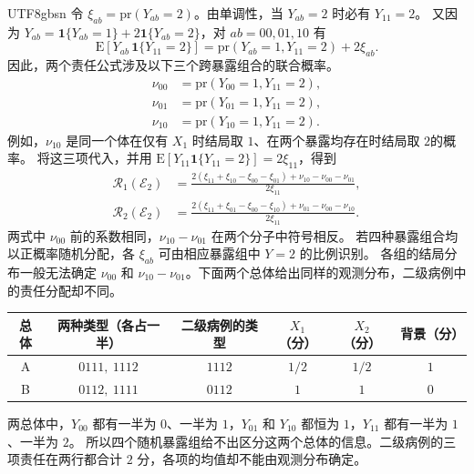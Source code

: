 \documentclass[11pt,a4paper]{article}
\begin{document}
\begin{CJK*}{UTF8}{gbsn}
令 $\xi_{ab}=\mathrm{pr}(Y_{ab}=2)$。由单调性，当 $Y_{ab}=2$ 时必有 $Y_{11}=2$。
又因为 $Y_{ab}=\mathbf{1}\{Y_{ab}=1\}+2\mathbf{1}\{Y_{ab}=2\}$，对 $ab=00,01,10$ 有
\[
 \mathrm E\!\left[Y_{ab}\,\mathbf{1}\{Y_{11}=2\}\right]
 =\mathrm{pr}(Y_{ab}=1,Y_{11}=2)+2\xi_{ab}.
\]
因此，两个责任公式涉及以下三个跨暴露组合的联合概率。
\[
\begin{aligned}
 \nu_{00}&=\mathrm{pr}(Y_{00}=1,Y_{11}=2),\\
 \nu_{01}&=\mathrm{pr}(Y_{01}=1,Y_{11}=2),\\
 \nu_{10}&=\mathrm{pr}(Y_{10}=1,Y_{11}=2).
\end{aligned}
\]
例如，$\nu_{10}$ 是同一个体在仅有 $X_1$ 时结局取 $1$、在两个暴露均存在时结局取 $2$的概率。
将这三项代入，并用 $\mathrm E[Y_{11}\mathbf{1}\{Y_{11}=2\}]=2\xi_{11}$，得到
\[
\begin{aligned}
 \mathcal R_1(\mathcal E_2)
 &=\frac{2(\xi_{11}+\xi_{10}-\xi_{00}-\xi_{01})+\nu_{10}-\nu_{00}-\nu_{01}}{2\xi_{11}},\\[3pt]
 \mathcal R_2(\mathcal E_2)
 &=\frac{2(\xi_{11}+\xi_{01}-\xi_{00}-\xi_{10})+\nu_{01}-\nu_{00}-\nu_{10}}{2\xi_{11}}.
\end{aligned}
\]
两式中 $\nu_{00}$ 前的系数相同，$\nu_{10}-\nu_{01}$ 在两个分子中符号相反。
若四种暴露组合均以正概率随机分配，各 $\xi_{ab}$ 可由相应暴露组中 $Y=2$ 的比例识别。
各组的结局分布一般无法确定 $\nu_{00}$ 和 $\nu_{10}-\nu_{01}$。下面两个总体给出同样的观测分布，二级病例中的责任分配却不同。
\begin{center}
\small
\renewcommand{\arraystretch}{1.22}
\begin{tabular}{@{}c c c c c c@{}}
\toprule
总体 & 两种类型（各占一半） & 二级病例的类型 & $X_1$（分） & $X_2$（分） & 背景（分）\\
\midrule
A & $0111,\ 1112$ & $1112$ & $1/2$ & $1/2$ & $1$\\
B & $0112,\ 1111$ & $0112$ & $1$ & $1$ & $0$\\
\bottomrule
\end{tabular}
\end{center}
两总体中，$Y_{00}$ 都有一半为 $0$、一半为 $1$，$Y_{01}$ 和 $Y_{10}$ 都恒为 $1$，$Y_{11}$ 都有一半为 $1$、一半为 $2$。
所以四个随机暴露组给不出区分这两个总体的信息。二级病例的三项责任在两行都合计 $2$ 分，各项的均值却不能由观测分布确定。
\clearpage

\end{CJK*}
\end{document}
